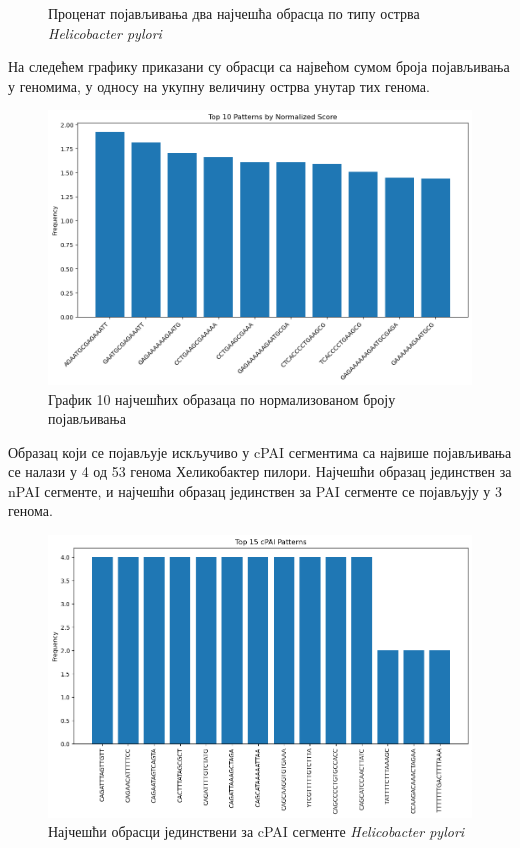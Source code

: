 \documentclass[12pt]{article}
\begin{document}
\begin{figure}[htbp]
\begin{subfigure}{0.41\linewidth}
    \end{subfigure}
    \caption{Проценат појављивања два најчешћа обрасца по типу острва \textit{Helicobacter pylori}}
    \vspace{0.5cm}
\end{figure}

\newpage

На следећем графику приказани су обрасци са највећом сумом броја појављивања у геномима, у односу на укупну величину острва унутар тих генома.

\begin{figure}[htbp]
    \centering
    \vspace{0.2cm}
    \includegraphics[width=\linewidth]{images/h_pylori/top10_normalized.png}
    \caption{График 10 најчешћих образаца по нормализованом броју појављивања}
    \vspace{0.5cm}
    \label{fig:top10histhpylori}
\end{figure}

Образац који се појављује искључиво у cPAI сегментима са највише појављивања се налази у 4 од 53 генома Хеликобактер пилори. Најчешћи образац јединствен за nPAI сегменте, и најчешћи образац јединствен за PAI сегменте се појављују у 3 генома.


\begin{figure}[h]
    \centering
    \includegraphics[width=0.8\linewidth]{images/h_pylori/top15_cpai.png}
    \caption{Најчешћи обрасци јединствени за cPAI сегменте \textit{Helicobacter pylori}}
    \label{fig:top15_cpai}
\end{figure}
\end{document}
